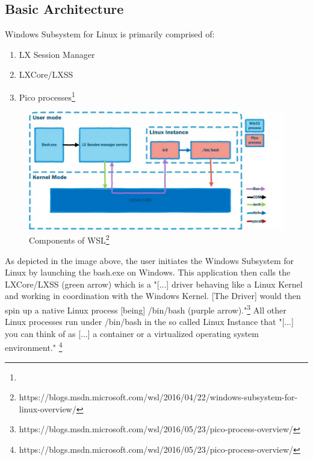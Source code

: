 \documentclass[utf8,biblatex]{lni}
\begin{document}
\subsection{Basic Architecture}

Windows Subsystem for Linux is primarily comprised of: 
\begin{enumerate}
    \item LX Session Manager
    \item LXCore/LXSS
    \item Pico processes\footnote{}
\end{enumerate}

\begin{figure}
  \centering
  \includegraphics[width=1\textwidth]{WSL Architecture.pdf}
  \caption{Components of WSL\footnote{https://blogs.msdn.microsoft.com/wsl/2016/04/22/windows-subsystem-for-linux-overview/}}
  \label{img:architecture}
\end{figure}


As depicted in the image above, the user initiates the Windows Subsystem for Linux by launching the bash.exe on Windows. This application then calls the LXCore/LXSS (green arrow) which is a "[...] driver behaving like a Linux Kernel and working in coordination with the Windows Kernel. [The Driver] would then spin up a native Linux process [being] /bin/bash (purple arrow)."\footnote{https://blogs.msdn.microsoft.com/wsl/2016/05/23/pico-process-overview/} All other Linux processes run under /bin/bash in the so called Linux Instance that "[...] you can think of as [...] a container or a virtualized operating system environment." \footnote{https://blogs.msdn.microsoft.com/wsl/2016/05/23/pico-process-overview/}
\end{document}
